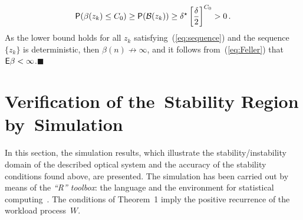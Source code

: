 \begin{multicols}{2}
\noindent
\begin{equation*}
{\sf P}(\beta(z_{k})\le C_0)\ge {\sf P}({\cal B}(z_k))\ge \delta^\star
\left[\displaystyle\frac{\displaystyle \delta\mathstrut}{\displaystyle 2\mathstrut}\right]^{C_0}>0\,. 
\end{equation*}
As  the lower bound holds for all $z_{k}$ satisfying~(\ref{eq:sequence}) 
and  the sequence $\{z_{k}\}$ is deterministic, then $\beta(n)\not\to\infty$, and
 it   follows from~(\ref{eq:Feller}) that ${\sf E}\beta<\infty$.\hfill$\blacksquare$
 

\section{Verification of the~Stability Region by~Simulation}
\setcounter{section}{4}

\noindent
In this section, the  simulation
results,  which illustrate the stability/instability domain of the
described optical system and the accuracy of the  stability
conditions found above, are presented. The simulation has been carried out by means
of the {\it ``R'' toolbox}: the language and the environment for
statistical computing~\cite{r_reference}. The conditions of Theorem~1
imply the positive recurrence of the workload process~$W$. 


\end{multicols}
